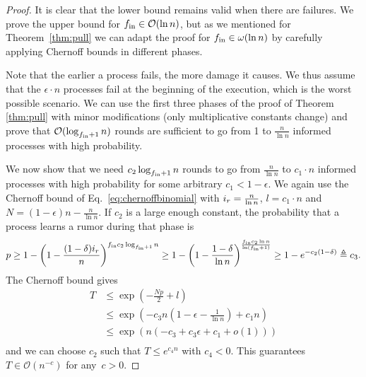 \begin{proof}
  It is clear that the lower bound remains valid when there are failures. We prove the upper bound for $f_\text{in}\in\mathcal{O}(\ln n)$, but as we mentioned for Theorem~\ref{thm:pull} we can adapt the proof for $f_\text{in}\in\omega(\ln n)$ by carefully applying Chernoff bounds in different phases.

Note that the earlier a process fails, the more damage it causes. We thus assume that the $\epsilon \cdot n$ processes fail at the beginning of the execution, which is the worst possible scenario. We can use the first three phases of the proof of Theorem \ref{thm:pull} with minor modifications (only multiplicative constants change) and prove that $\mathcal{O}(\log_{f_\text{in} + 1} n)$ rounds are sufficient to go from 1 to $\frac{n}{\ln n}$ informed processes with high probability. 

We now show that we need $c_2\log_{f_\text{in} + 1} n$ rounds to go from $\frac{n}{\ln n}$ to $c_1 \cdot n$ informed processes with high probability for some arbitrary $c_1 < 1-\epsilon$. We again use the Chernoff bound of Eq.~\eqref{eq:chernoffbinomial} with $i_{r}=\frac{n}{\ln n}$, $l = c_1 \cdot n$ and $N = (1-\epsilon) n - \frac{n}{\ln n}$. If $c_2$ is a large enough constant, the probability that a process learns a rumor during that phase is
  \begin{align}
  p \geq 1-\left(1-\frac{(1-\delta)i_{r}}{n}\right)^{f_\text{in} c_2\log_{f_\text{in} + 1} n} \geq 1-\left(1-\frac{1-\delta}{\ln n}\right)^{\frac{f_\text{in} c_2\ln n}{\ln(f_\text{in}+1)}} \geq 1-e^{-c_2(1-\delta)} \triangleq c_3.
  \end{align}
The Chernoff bound gives
\begin{equation}
 \begin{split}
    T & \leq \exp\left(-\frac{Np}{2}+l\right) \\
      & \leq \exp \left( -c_3n\left(1-\epsilon-\frac{1}{\ln n}\right)+c_1 n \right)\\
     & \leq \exp \left( n\left(-c_3+c_3\epsilon+c_1+o(1) \right)\right)\\
   \end{split}
 \end{equation}
and we can choose $c_2$ such that $T \leq e^{c_4 n}$ with $c_4 < 0$. This guarantees $T \in \mathcal{O}\left(n^{-c}\right)$ for any~$c>0$.


\end{proof}
